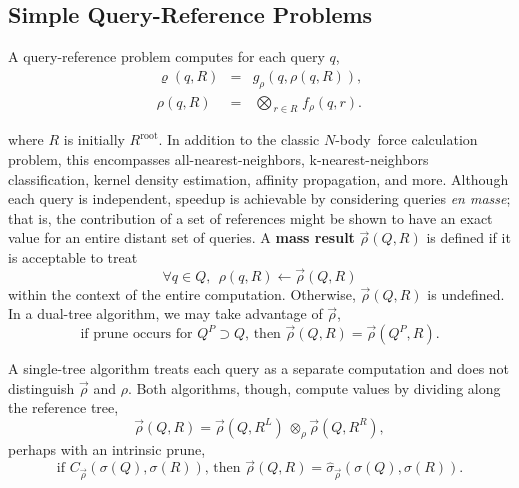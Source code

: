\documentclass[times, leqno,twocolumn]{article}
\newcommand{\summary}{\hat{\sigma}}
\newcommand{\defterm}[1]{{\bf #1}}
\newcommand{\nbody}{$N$-body}
\newcommand{\kdroot}[1]{#1^{\text{root}}}
\newcommand{\kdleft}[1]{#1^{\!L}}
\newcommand{\kdright}[1]{#1^{\!R}}
\newcommand{\kdparent}[1]{#1^{\!P}}
\newcommand{\nameOp}[2]{\mathop{#1\nolimits\!\!_{#2}}}
\newcommand{\nameop}[2]{{\scriptstyle\:}#1_{\!#2}}
\newcommand{\myOp}[1]{\nameOp{\bigotimes}{#1}}
\newcommand{\myop}[1]{\nameop{\otimes}{#1}}
\newcommand{\letterqr}{\rho}
\newcommand{\outqr}{\varrho}
\newcommand{\inqr}{\rho}
\newcommand{\Opqr}{\myOp{\letterqr}}
\newcommand{\opqr}{\myop{\letterqr}}
\newcommand{\fqr}{f_{\!\letterqr}}
\newcommand{\gqr}{g_{\!\letterqr}}
\newcommand{\letterqrv}{\vec{\rho}}
\newcommand{\inqrv}{\vec{\rho}}
\newcommand{\deltaqrv}{\summary_{\!\letterqrv}}
\newcommand{\canpruneqrv}{C_{\!\letterqrv}}
\newcommand{\outstat}{\sigma}
\begin{document}
\subsection{Simple Query-Reference Problems}
A query-reference problem computes for each query $q$,
\begin{eqnarray*}
\outqr(q, R) &=& \gqr(q, \inqr(q, R)),
\\
\inqr(q, R) &=& \Opqr_{r \in R} \fqr(q, r).
\end{eqnarray*}

\noindent where $R$ is initially $\kdroot{R}$.
In addition to the classic \nbody\ force calculation problem, this encompasses all-nearest-neighbors, k-nearest-neighbors classification, kernel density estimation, affinity propagation, and more.
 Although each query is independent, speedup is achievable by considering queries {\it en masse}; that is, the contribution of a set of references might be shown to have an exact value for an entire distant set of queries.
A \defterm{mass result} $\inqrv(Q, R)$ is defined if it is acceptable to treat
\[
\forall q \in Q,~~ \inqr(q, R) \gets \inqrv(Q, R)
\]
\noindent within the context of the entire computation.
Otherwise, $\inqrv(Q,R)$ is undefined.
In a dual-tree algorithm, we may take advantage of $\inqrv$,
\begin{equation*}
\text{if prune occurs for } \kdparent{Q} \supset Q \text{, then } \inqrv(Q, R) = \inqrv(\kdparent{Q}, R).
\label{eqn:parentqrv}
\end{equation*}

\noindent
A single-tree algorithm treats each query as a separate computation and does not distinguish $\inqrv$ and $\inqr$.
Both algorithms, though, compute values by dividing along the reference tree,
\begin{equation*}
\inqrv(Q, R) = \inqrv(Q, \kdleft{R}) \opqr \inqrv(Q, \kdright{R}),
\label{eqn:dividepi}
\end{equation*}
\noindent perhaps with an intrinsic prune,
\begin{equation*}
\text{if } \canpruneqrv(\outstat(Q), \outstat(R)) \text{, then } \inqrv(Q, R) = \deltaqrv(\outstat(Q), \outstat(R)).
\label{eqn:prunepi}
\end{equation*}
\end{document}
